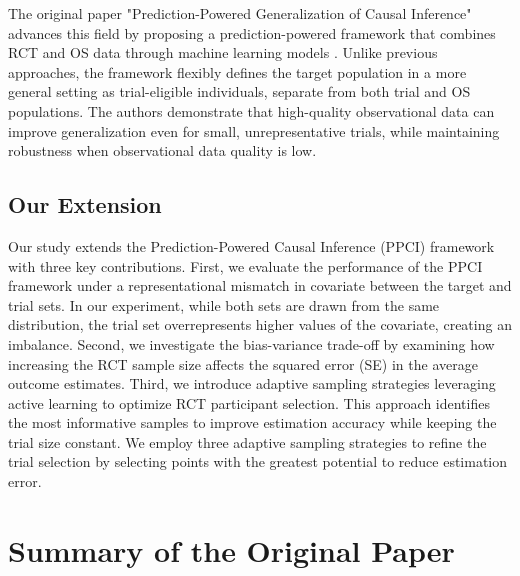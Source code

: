 \documentclass[12pt, oneside]{amsart}
\theoremstyle{definition}
\theoremstyle{remark}
\numberwithin{equation}{section}
\begin{document}
The original paper "Prediction-Powered Generalization of Causal Inference" advances this field by proposing a prediction-powered framework that combines RCT and OS data through machine learning models \citep{qp}. Unlike previous approaches, the framework flexibly defines the target population in a more general setting as trial-eligible individuals, separate from both trial and OS populations. The authors demonstrate that high-quality observational data can improve generalization even for small, unrepresentative trials, while maintaining robustness when observational data quality is low. 

\subsection{Our Extension}
Our study extends the Prediction-Powered Causal Inference (PPCI) framework with three key contributions. First, we evaluate the performance of the PPCI framework under a representational mismatch in covariate between the target and trial sets. In our experiment, while both sets are drawn from the same distribution, the trial set overrepresents higher values of the covariate, creating an imbalance. Second, we investigate the bias-variance trade-off by examining how increasing the RCT sample size affects the squared error (SE) in the average outcome estimates. Third, we introduce adaptive sampling strategies leveraging active learning to optimize RCT participant selection. This approach identifies the most informative samples to improve estimation accuracy while keeping the trial size constant. We employ three adaptive sampling strategies to refine the trial selection by selecting points with the greatest potential to reduce estimation error.

\section{Summary of the Original Paper}
\end{document}
